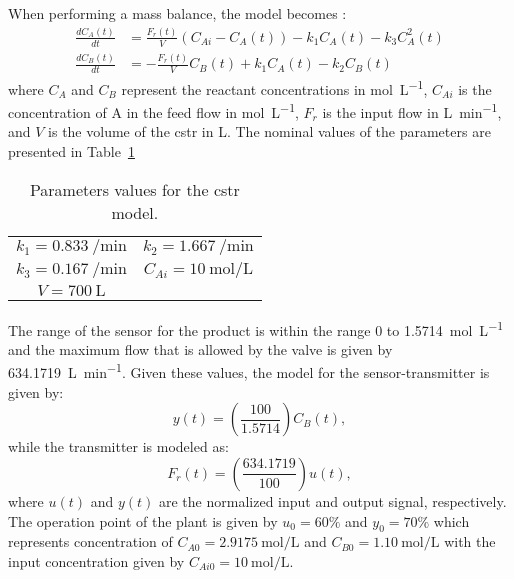 When performing a mass balance, the model becomes \citep{Arrieta2010}:
%
\begin{equation}
\begin{split}
\frac{dC_A(t)}{dt} & = \frac{F_r(t)}{V} \left(C_{Ai}-C_A(t)\right) - k_1 C_A(t) - k_3 C^2_A(t)\\
\frac{dC_B(t)}{dt} & = -\frac{F_r(t)}{V} C_B(t)+ k_1 C_A(t) - k_2 C_B(t)
\end{split}
\label{eq:CSTRMVE}
\end{equation}
%
where $C_A$ and $C_B$ represent the reactant concentrations  in \si{\mole\per\liter}, $C_{Ai}$ is the concentration of A in the feed flow in \si{\mole\per\liter}, $F_r$ is the input flow in \si{\liter\per\minute}, and $V$ is the volume of the \gls{cstr} in \si{\liter}. The nominal values of the parameters are presented in Table~\ref{tab:ParamCSTR}%
%
\begin{table}[tb]
	\centering
	\caption{Parameters values for the \gls{cstr} model.}
	\begin{tabular}{cc}
		\toprule
		$k_1 = \SI{0.833}{\per\minute}$ & $k_2 = \SI{1.667}{\per\minute}$ \\
		$k_3 = \SI{0.167}{\per\minute}$ & $C_{Ai} = \SI{10}{\mole\per\liter}$\\
		$V = \SI{700}{\liter}$\\
		\bottomrule
	\end{tabular}
	\label{tab:ParamCSTR}
\end{table}
%

The range of the sensor for the product is within the range 0 to \SI{1.5714}{\mole\per\liter} and the maximum flow that is allowed by the valve is given by \SI{634.1719}{\liter\per\minute}. Given these values, the model for the sensor-transmitter is given by:
\begin{equation}
	y(t) = \left(\frac{100}{1.5714}\right) C_B(t),
	\label{eq:Sensor}
\end{equation}
%
while the transmitter is modeled as:
\begin{equation}
F_r(t) = \left(\frac{634.1719}{100}\right) u(t),
\label{eq:Transmiter}
\end{equation}
%
where $u(t)$ and $y(t)$ are the normalized input and output signal, respectively. The operation point of the plant is given by $u_0 = 60\%$ and $y_0 = 70\%$ which represents concentration of $C_{A0} = \SI{2.9175}{\mole\per\liter}$ and $C_{B0} = \SI{1.10}{\mole\per\liter}$ with the input concentration given by $C_{Ai0} = \SI{10}{\mole\per\liter}$.


